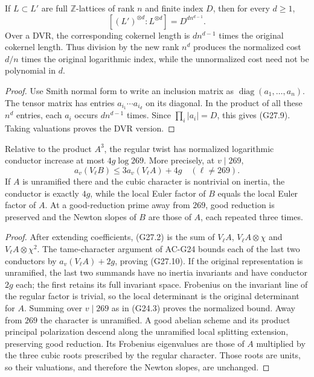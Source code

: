 \begin{lemma}
\label{AC-G27-tensor}
If $L\subset L'$ are full $\mathbb Z$-lattices of rank $n$
and finite index $D$, then for every $d\geq1$,
\[
 [(L')^{\otimes d}:L^{\otimes d}]
            =D^{d n^{d-1}}.                             \tag{G27.9}
\]
Over a DVR, the corresponding cokernel length is
$d n^{d-1}$ times the original cokernel length.
Thus division by the new rank $n^d$ produces the normalized
cost $d/n$ times the original logarithmic index, while the
unnormalized cost need not be polynomial in $d$.
\end{lemma}
\begin{proof}
Use Smith normal form to write an inclusion matrix as
$\operatorname{diag}(a_1,\ldots,a_n)$.
The tensor matrix has entries
$a_{i_1}\cdots a_{i_d}$ on its diagonal.  In the product of
all these $n^d$ entries, each $a_i$ occurs $d n^{d-1}$
times.  Since $\prod_i|a_i|=D$, this gives (G27.9).
Taking valuations proves the DVR version.
\end{proof}

\begin{corollary}
\label{AC-G27-conductor}
Relative to the product $A^3$, the regular twist has normalized
logarithmic conductor increase at most $4g\log269$.
More precisely, at $v\mid269$,
\[
 a_v(V_\ell B)\leq3a_v(V_\ell A)+4g
 \quad(\ell\ne269).                                   \tag{G27.10}
\]
If $A$ is unramified there and the cubic character is nontrivial
on inertia, the conductor is exactly $4g$, while the local Euler
factor of $B$ equals the local Euler factor of $A$.
At a good-reduction prime away from $269$, good reduction is
preserved and the Newton slopes of $B$ are those of $A$, each
repeated three times.
\end{corollary}
\begin{proof}
After extending coefficients, (G27.2) is the sum of
$V_\ell A$, $V_\ell A\otimes\chi$ and
$V_\ell A\otimes\chi^2$.
The tame-character argument of AC-G24 bounds each of the last
two conductors by $a_v(V_\ell A)+2g$, proving (G27.10).
If the original representation is unramified, the last two
summands have no inertia invariants and have conductor $2g$
each; the first retains its full invariant space.  Frobenius
on the invariant line of the regular factor is trivial, so
the local determinant is the original determinant for $A$.
Summing over $v\mid269$ as in (G24.3) proves the normalized
bound.  Away from $269$ the character is unramified.  A good
abelian scheme and its product principal polarization descend
along the unramified local splitting extension, preserving
good reduction.  Its Frobenius eigenvalues are those of $A$
multiplied by the three cubic roots prescribed by the regular
character.  Those roots are units, so their valuations, and
therefore the Newton slopes, are unchanged.
\end{proof}

